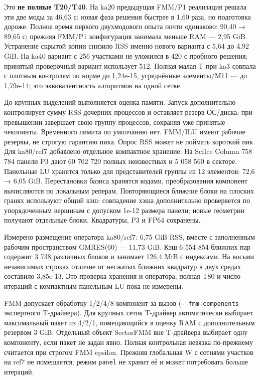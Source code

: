 \documentclass[
  russian,
  11pt,
  a4paper,
]{report}
\begin{document}
Это \textbf{не полные T20/T40}. На ka20 предыдущая FMM/P1 реализация
решала эти две моды за 46,63 с: новая фаза решения быстрее в 1,60 раза,
но подготовка дороже. Полное время первого двухмодового опыта почти
одинаково: 90,40 → 89,65 с; прежняя FMM/P1 конфигурация занимала меньше
RAM --- 2,95 GiB. Устранение скрытой копии снизило RSS именно нового
варианта с 5,64 до 4,92 GiB. На ka40 вариант с 256 участками не уложился
в 420 с пробного решения; принятый проверочный вариант использует 512.
Полная малая T при ka3 совпала с плотным контролем по норме до 1,24e-15,
усреднённые элементы/M11 --- до 1,79e-14; это эквивалентность алгоритмов
на одной сетке.

До крупных выделений выполняется оценка памяти. Запуск дополнительно
контролирует сумму RSS дочерних процессов и оставляет резерв ОС/диска;
при превышении завершает свою группу процессов, сохраняя уже принятые
чекпоинты. Временного лимита по умолчанию нет. FMM/ILU имеют рабочие
резервы, не строгую гарантию пика. Опрос RSS может не поймать короткий
пик. Для ka80/ref7 добавлено отдельное компактное хранение. На SciIce
Column 758 784 панели P3 дают 60 702 720 полных неизвестных и 5 058 560
в секторе. Панельные LU хранятся только для представителей группы из 12
элементов: 72,6 → 6,05 GiB. Перестановки базиса хранятся кодами,
преобразования компонент вычисляются по локальным реперам. Повторяющиеся
ближние блоки на плоских гранях используют общий кэш: совпадение хэша
дополнительно проверяется по упорядоченным вершинам с допуском 1e-12
размера панели; новые геометрии получают отдельные блоки. Квадратуры, P3
и FP64 сохранены.

Измерено размещение оператора ka80/ref7: 6,75 GiB RSS, вместе с
заполненным рабочим пространством GMRES(60) --- 11,73 GiB. Кэш 6 554 854
ближних пар содержит 3 738 различных блоков и занимает 126,4 MiB с
индексами. На восьми независимых строках отличие от несжатых ближних
квадратур в двух средах составило 3,85e-13. Это проверка хранения и
оператора; полная T80 и число итераций с компактным панельным LU пока не
измерены.

FMM допускает обработку 1/2/4/8 компонент за вызов
(\nolinkurl{--fmm-components} экспертного T-драйвера). Для крупных сеток
T-драйвер автоматически выбирает максимальный пакет из 4/2/1,
помещающийся в оценку RAM с дополнительным резервом 3 GiB. Отдельный
объект SectorFMM вне T-драйвера выбирает одну компоненту, если пакет не
задан явно. Полная контрольная невязка по-прежнему считается при строгом
FMM epsilon. Прежняя глобальная W с сотнями участков на ref7 не
помещается; режим \nolinkurl{panel} не хранит её и может потребовать
больше итераций.
\end{document}
